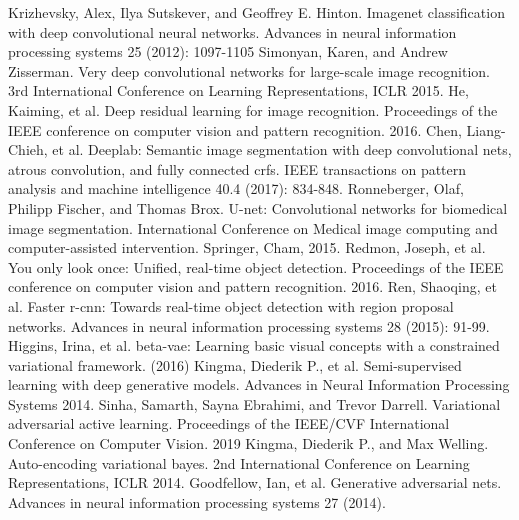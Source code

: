 \documentclass[runningheads]{llncs}
\begin{document}
%
%
%

%
%
\begin{thebibliography}{8}
    Krizhevsky, Alex, Ilya Sutskever, and Geoffrey E. Hinton. Imagenet classification with deep convolutional neural networks. Advances in neural information processing systems 25 (2012): 1097-1105
    Simonyan, Karen, and Andrew Zisserman. Very deep convolutional networks for large-scale image recognition. 3rd International Conference on Learning Representations, {ICLR} 2015.
    He, Kaiming, et al. Deep residual learning for image recognition. Proceedings of the IEEE conference on computer vision and pattern recognition. 2016.
    Chen, Liang-Chieh, et al. Deeplab: Semantic image segmentation with deep convolutional nets, atrous convolution, and fully connected crfs. IEEE transactions on pattern analysis and machine intelligence 40.4 (2017): 834-848.
    Ronneberger, Olaf, Philipp Fischer, and Thomas Brox. U-net: Convolutional networks for biomedical image segmentation. International Conference on Medical image computing and computer-assisted intervention. Springer, Cham, 2015.
    Redmon, Joseph, et al. You only look once: Unified, real-time object detection. Proceedings of the IEEE conference on computer vision and pattern recognition. 2016.
    Ren, Shaoqing, et al. Faster r-cnn: Towards real-time object detection with region proposal networks. Advances in neural information processing systems 28 (2015): 91-99.
    Higgins, Irina, et al. beta-vae: Learning basic visual concepts with a constrained variational framework. (2016)
    Kingma, Diederik P., et al. Semi-supervised learning with deep generative models. Advances in Neural Information Processing Systems 2014.
    Sinha, Samarth, Sayna Ebrahimi, and Trevor Darrell. Variational adversarial active learning. Proceedings of the IEEE/CVF International Conference on Computer Vision. 2019
    Kingma, Diederik P., and Max Welling. Auto-encoding variational bayes. 2nd International Conference on Learning Representations, {ICLR} 2014.
    Goodfellow, Ian, et al. Generative adversarial nets. Advances in neural information processing systems 27 (2014).

\end{thebibliography}
\end{document}
